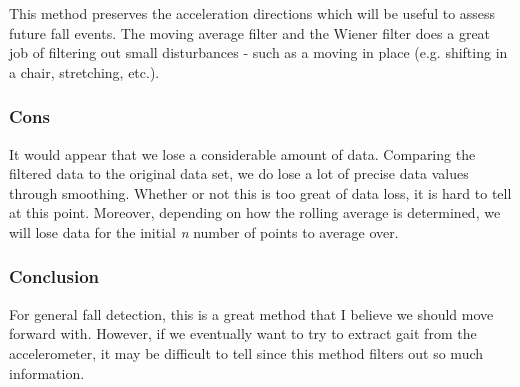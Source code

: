 \documentclass[11pt]{article}
\begin{document}
This method preserves the acceleration directions which will be useful
to assess future fall events. The moving average filter and the Wiener
filter does a great job of filtering out small disturbances - such as a
moving in place (e.g. shifting in a chair, stretching, etc.).

\subsubsection{\texorpdfstring{\textbf{Cons}}{Cons}}\label{cons}

It would appear that we lose a considerable amount of data. Comparing
the filtered data to the original data set, we do lose a lot of precise
data values through smoothing. Whether or not this is too great of data
loss, it is hard to tell at this point. Moreover, depending on how the
rolling average is determined, we will lose data for the initial
\emph{n} number of points to average over.

\subsubsection{\texorpdfstring{\textbf{Conclusion}}{Conclusion}}\label{conclusion}

For general fall detection, this is a great method that I believe we
should move forward with. However, if we eventually want to try to
extract gait from the accelerometer, it may be difficult to tell since
this method filters out so much information.


    
    
    
    
\end{document}

